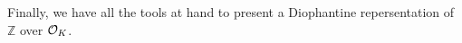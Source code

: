 Finally, we have all the tools at hand to present a Diophantine repersentation
of \(ℤ\) over \(\mathcal{O}_{K}\).

